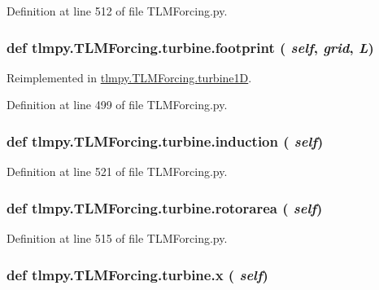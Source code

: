 Definition at line 512 of file TLMForcing.py.\hypertarget{classtlmpy_1_1TLMForcing_1_1turbine_a764519b6add9e5386dca0d4055e65d3f}{
\subsubsection[{footprint}]{\setlength{\rightskip}{0pt plus 5cm}def tlmpy.TLMForcing.turbine.footprint ( {\em self}, \/   {\em grid}, \/   {\em L})}}
\label{classtlmpy_1_1TLMForcing_1_1turbine_a764519b6add9e5386dca0d4055e65d3f}


Reimplemented in \hyperlink{classtlmpy_1_1TLMForcing_1_1turbine1D_a4e3f2846f7ba754decf5d0ae2c00e3aa}{tlmpy.TLMForcing.turbine1D}.

Definition at line 499 of file TLMForcing.py.\hypertarget{classtlmpy_1_1TLMForcing_1_1turbine_af6ba60baabd3219d98525b052bc3557d}{
\subsubsection[{induction}]{\setlength{\rightskip}{0pt plus 5cm}def tlmpy.TLMForcing.turbine.induction ( {\em self})}}
\label{classtlmpy_1_1TLMForcing_1_1turbine_af6ba60baabd3219d98525b052bc3557d}


Definition at line 521 of file TLMForcing.py.\hypertarget{classtlmpy_1_1TLMForcing_1_1turbine_abae528e3d2f36dbf3e6b43192807218b}{
\subsubsection[{rotorarea}]{\setlength{\rightskip}{0pt plus 5cm}def tlmpy.TLMForcing.turbine.rotorarea ( {\em self})}}
\label{classtlmpy_1_1TLMForcing_1_1turbine_abae528e3d2f36dbf3e6b43192807218b}


Definition at line 515 of file TLMForcing.py.\hypertarget{classtlmpy_1_1TLMForcing_1_1turbine_aefc43a05f1275ba14c6bdb3e6aa7f210}{
\subsubsection[{x}]{\setlength{\rightskip}{0pt plus 5cm}def tlmpy.TLMForcing.turbine.x ( {\em self})}}
\label{classtlmpy_1_1TLMForcing_1_1turbine_aefc43a05f1275ba14c6bdb3e6aa7f210}


